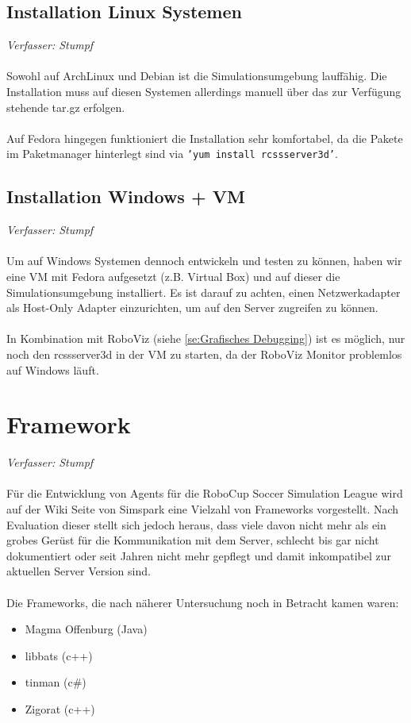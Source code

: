 \documentclass[fontsize=12pt,a4paper,final]{scrartcl}[2003/01/01]
\begin{document}
\subsection{Installation Linux Systemen}
\textit{Verfasser: Stumpf}\\
\\
Sowohl auf ArchLinux und Debian ist die Simulationsumgebung lauffähig. Die Installation muss auf diesen Systemen allerdings manuell über das zur Verfügung stehende tar.gz erfolgen.\\
\\
Auf Fedora hingegen funktioniert die Installation sehr komfortabel, da die Pakete im Paketmanager hinterlegt sind via \texttt{'yum install rcssserver3d'}.
\subsection{Installation Windows + VM}
\textit{Verfasser: Stumpf}\\
\\
Um auf Windows Systemen dennoch entwickeln und testen zu können, haben wir eine VM mit Fedora aufgesetzt (z.B. Virtual Box) und auf dieser die Simulationsumgebung installiert. Es ist darauf zu achten, einen Netzwerkadapter als Host-Only Adapter einzurichten, um auf den Server zugreifen zu können.\\
\\
In Kombination mit RoboViz (siehe \autoref{se:Grafisches Debugging}) ist es möglich, nur noch den rcssserver3d in der VM zu starten, da der RoboViz Monitor problemlos auf Windows läuft.

\section{Framework}
\textit{Verfasser: Stumpf}\\
\\
Für die Entwicklung von Agents für die RoboCup Soccer Simulation League wird auf der Wiki Seite von Simspark eine Vielzahl von Frameworks vorgestellt. Nach Evaluation dieser stellt sich jedoch heraus, dass viele davon nicht mehr als ein grobes Gerüst für die Kommunikation mit dem Server, schlecht bis gar nicht dokumentiert oder seit Jahren nicht mehr gepflegt und damit inkompatibel zur aktuellen Server Version sind.\\
\\
Die Frameworks, die nach näherer Untersuchung noch in Betracht kamen waren:
\begin{itemize}
\item Magma Offenburg (Java)
\item libbats (c++)
\item tinman (c\#)
\item Zigorat (c++)
\end{itemize}
\end{document}
